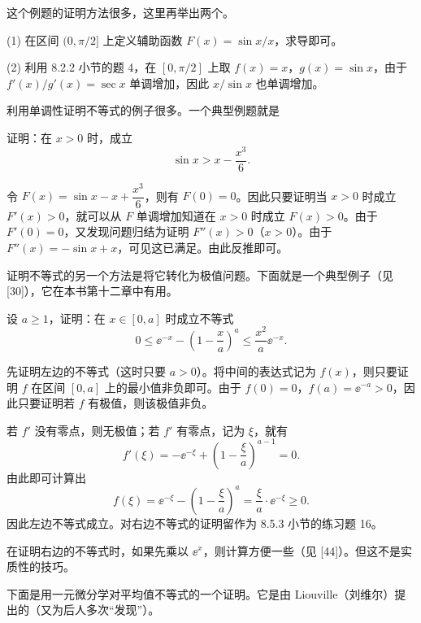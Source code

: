 \begin{xremark}
这个例题的证明方法很多，这里再举出两个。

(1) 在区间 $(0,\pi/2]$ 上定义辅助函数 $F(x)=\sin x/x$，求导即可。

(2) 利用 8.2.2 小节的题 4，在 $[0,\pi/2]$ 上取 $f(x)=x$，$g(x)=\sin x$，由于 $f'(x)/g'(x)=\operatorname{sec}x$ 单调增加，因此 $x/\sin x$ 也单调增加。
\end{xremark}

利用单调性证明不等式的例子很多。一个典型例题就是

\begin{xexample}[8.5.3]
证明：在 $x>0$ 时，成立
\[
  \sin x>x-\frac{x^3}{6}.
\]
\end{xexample}
\begin{xproof}
令 $F(x)=\sin x-x+\dfrac{x^3}{6}$，则有 $F(0)=0$。因此只要证明当 $x>0$ 时成立 $F'(x)>0$，就可以从 $F$ 单调增加知道在 $x>0$ 时成立 $F(x)>0$。由于 $F'(0)=0$，又发现问题归结为证明 $F''(x)>0$（$x>0$）。由于 $F''(x)=-\sin x+x$，可见这已满足。由此反推即可。
\end{xproof}

证明不等式的另一个方法是将它转化为极值问题。下面就是一个典型例子（见 [30]），它在本书第十二章中有用。

\begin{xexample}[8.5.4]
设 $a\ge1$，证明：在 $x\in[0,a]$ 时成立不等式
\[
  0\le\ee^{-x}-\left(1-\frac xa\right)^a
  \le\frac{x^2}{a}\ee^{-x}.
\]
\end{xexample}
\begin{xproof}
先证明左边的不等式（这时只要 $a>0$）。将中间的表达式记为 $f(x)$，则只要证明 $f$ 在区间 $[0,a]$ 上的最小值非负即可。由于 $f(0)=0$，$f(a)=\ee^{-a}>0$，因此只要证明若 $f$ 有极值，则该极值非负。

若 $f'$ 没有零点，则无极值；若 $f'$ 有零点，记为 $\xi$，就有
\[
  f'(\xi)=-\ee^{-\xi}+\left(1-\frac\xi a\right)^{a-1}=0.
\]
由此即可计算出
\[
  f(\xi)=\ee^{-\xi}-\left(1-\frac\xi a\right)^a
  =\frac\xi a\cdot\ee^{-\xi}\ge0.
\]
因此左边不等式成立。对右边不等式的证明留作为 8.5.3 小节的练习题 16。
\end{xproof}

\begin{xremark}
在证明右边的不等式时，如果先乘以 $\ee^x$，则计算方便一些（见 [44]）。但这不是实质性的技巧。
\end{xremark}

下面是用一元微分学对平均值不等式的一个证明。它是由 Liouville（刘维尔）提出的（又为后人多次“发现”）。

